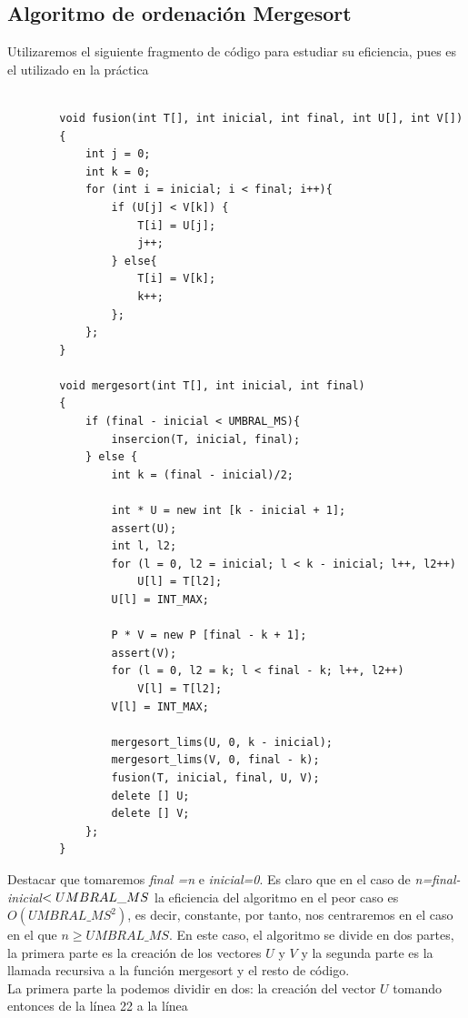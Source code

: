 \documentclass[11pt]{article}
\begin{document}
        \subsection*{Algoritmo de ordenación Mergesort}
        Utilizaremos el siguiente fragmento de código para estudiar su eficiencia, pues es el utilizado en la práctica
        \begin{lstlisting}
  
        void fusion(int T[], int inicial, int final, int U[], int V[])
        {
            int j = 0;
            int k = 0;
            for (int i = inicial; i < final; i++){
                if (U[j] < V[k]) {
                    T[i] = U[j];
                    j++;
                } else{
                    T[i] = V[k];
                    k++;
                };
            };
        }

        void mergesort(int T[], int inicial, int final)
        {
            if (final - inicial < UMBRAL_MS){
                insercion(T, inicial, final);
            } else {
                int k = (final - inicial)/2;

                int * U = new int [k - inicial + 1];
                assert(U);
                int l, l2;
                for (l = 0, l2 = inicial; l < k - inicial; l++, l2++)
                    U[l] = T[l2];
                U[l] = INT_MAX;

                P * V = new P [final - k + 1];
                assert(V);
                for (l = 0, l2 = k; l < final - k; l++, l2++)
                    V[l] = T[l2];
                V[l] = INT_MAX;

                mergesort_lims(U, 0, k - inicial);
                mergesort_lims(V, 0, final - k);
                fusion(T, inicial, final, U, V);
                delete [] U;
                delete [] V;
            };
        }
        \end{lstlisting}
        Destacar que tomaremos \textit{final =n} e \textit{inicial=0}. Es claro que en el caso de \textit{n=final-inicial}$<\nobreak UMBRAL\_MS$ 
        la eficiencia del algoritmo en el peor caso es $O(UMBRAL\_MS^2)$, es decir, constante, por tanto, nos centraremos en el caso en el que $n\geq UMBRAL\_MS$.
        En este caso, el algoritmo se divide en dos partes, la primera parte es la creación de los vectores $U$ y $V$ y la segunda parte es la
        llamada recursiva a la función mergesort y el resto de código. \\
        La primera parte la podemos dividir en dos: la creación del vector $U$ tomando entonces de la línea 22 a la línea
\end{document}
